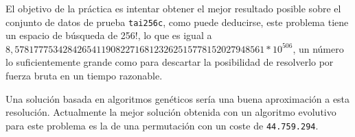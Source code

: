 \bigskip
El objetivo de la práctica es intentar obtener el mejor resultado posible sobre el conjunto de datos de prueba \texttt{tai256c}, como puede deducirse, este problema tiene un espacio de búsqueda de 256!, lo que es igual a $8{,}5781777534284265411908227168123262515778152027948561*10^{506}$, un número lo suficientemente grande como para descartar la posibilidad de resolverlo por fuerza bruta en un tiempo razonable.

\bigskip
Una solución basada en algoritmos genéticos sería una buena aproximación a  esta resolución. Actualmente la mejor solución obtenida con un algoritmo evolutivo para este problema es la de una permutación con un coste de \texttt{44.759.294}.
